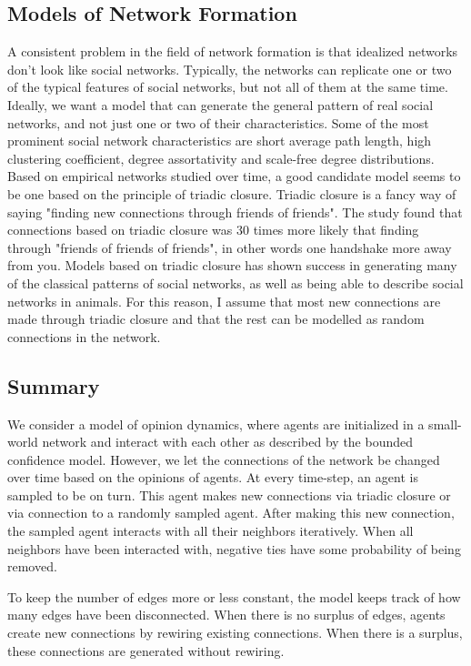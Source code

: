 \documentclass[9pt,twocolumn,twoside]{ilcss}
\begin{document}
\subsection{Models of Network Formation}
A consistent problem in the field of network formation is that idealized networks don't look like social networks.
Typically, the networks can replicate one or two of the typical features of social networks, but not all of them at the same time. 
Ideally, we want a model that can generate the general pattern of real social networks, and not just one or two of their characteristics.
Some of the most prominent social network characteristics are short average path length, high clustering coefficient, degree assortativity and scale-free degree distributions. 
Based on empirical networks studied over time, a good candidate model seems to be one based on the principle of triadic closure.
Triadic closure is a fancy way of saying "finding new connections through friends of friends". The study found that connections based on triadic closure was 30 times more likely that finding through "friends of friends of friends", in other words one handshake more away from you. 
Models based on triadic closure has shown success in generating many of the classical patterns of social networks, as well as being able to describe social networks in animals. 
For this reason, I assume that most new connections are made through triadic closure and that the rest can be modelled as random connections in the network. 

\subsection{Summary}
We consider a model of opinion dynamics, where agents are initialized in a small-world network and interact with each other as described by the bounded confidence model.
However, we let the connections of the network be changed over time based on the opinions of agents. 
At every time-step, an agent is sampled to be on turn. This agent makes new connections via triadic closure or via connection to a randomly sampled agent.
After making this new connection, the sampled agent interacts with all their neighbors iteratively. When all neighbors have been interacted with, negative ties have some probability of being removed.

To keep the number of edges more or less constant, the model keeps track of how many edges have been disconnected. When there is no surplus of edges, agents create new connections by rewiring existing connections. When there is a surplus, these connections are generated without rewiring. 
\end{document}
